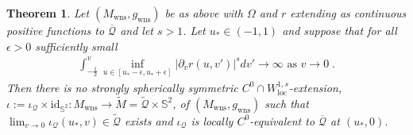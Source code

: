 \documentclass{article}
\newcommand{\Q}{\mathcal{Q}}
\newcommand{\loc}{\mathrm{loc}}
\newcommand{\Sp}{\mathbb{S}}
\newcommand{\id}{\mathrm{id}}
\newcommand{\Mw}{M_{\mathrm{wns}}}
\newcommand{\gw}{g_{\mathrm{wns}}}
\newtheorem{thm}[definition]{Theorem}
\begin{document}
\begin{thm}\label{thm:Christoffelblowup}
Let $(\Mw,\gw)$ be as above with $\Omega$ and $r$ extending as continuous positive functions to $\overline{\Q}$ and let $s>1$. Let $u_*\in(-1,1)$ and suppose that for all $\epsilon>0$ sufficiently small 
\begin{equation}\label{eqn:blowupassumption}
    \begin{split}
       \int_{-\frac{1}{2}}^v \inf_{u\in[u_*-\epsilon,u_*+\epsilon]}  \left|\partial_vr(u,v')\right|^{s} dv'\to\infty\text{ as }v\to0\;.
    \end{split}
\end{equation} 
Then there is no strongly spherically symmetric $C^0\cap W^{1,s}_{\loc}$-extension, $\iota:=\iota_\Q\times\id_{\Sp^2} :\Mw\rightarrow\tilde{M}=\tilde{\Q}\times\Sp^2 $, of $(\Mw,\gw)$ 
such that $\lim_{v\to0}\iota_\Q(u_*,v) \in \tilde{\Q}$ exists and $\iota_\Q$ is locally $C^0$-equivalent to $\overline{\Q}$ at $(u_*,0)$.
\end{thm}
\end{document}

